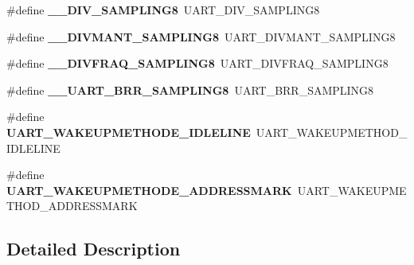 \begin{DoxyCompactItemize}
\item 
\#define {\bfseries \+\_\+\+\_\+\+D\+I\+V\+\_\+\+S\+A\+M\+P\+L\+I\+N\+G8}~U\+A\+R\+T\+\_\+\+D\+I\+V\+\_\+\+S\+A\+M\+P\+L\+I\+N\+G8\hypertarget{group___h_a_l___u_a_r_t___aliased___defines_ga5cba2faadc25e5ece57cd3322adf4151}{}\label{group___h_a_l___u_a_r_t___aliased___defines_ga5cba2faadc25e5ece57cd3322adf4151}

\item 
\#define {\bfseries \+\_\+\+\_\+\+D\+I\+V\+M\+A\+N\+T\+\_\+\+S\+A\+M\+P\+L\+I\+N\+G8}~U\+A\+R\+T\+\_\+\+D\+I\+V\+M\+A\+N\+T\+\_\+\+S\+A\+M\+P\+L\+I\+N\+G8\hypertarget{group___h_a_l___u_a_r_t___aliased___defines_ga79e617709be4f56d9a327ca3a7dc316f}{}\label{group___h_a_l___u_a_r_t___aliased___defines_ga79e617709be4f56d9a327ca3a7dc316f}

\item 
\#define {\bfseries \+\_\+\+\_\+\+D\+I\+V\+F\+R\+A\+Q\+\_\+\+S\+A\+M\+P\+L\+I\+N\+G8}~U\+A\+R\+T\+\_\+\+D\+I\+V\+F\+R\+A\+Q\+\_\+\+S\+A\+M\+P\+L\+I\+N\+G8\hypertarget{group___h_a_l___u_a_r_t___aliased___defines_gac09eaea0db063364f5aac90f47791989}{}\label{group___h_a_l___u_a_r_t___aliased___defines_gac09eaea0db063364f5aac90f47791989}

\item 
\#define {\bfseries \+\_\+\+\_\+\+U\+A\+R\+T\+\_\+\+B\+R\+R\+\_\+\+S\+A\+M\+P\+L\+I\+N\+G8}~U\+A\+R\+T\+\_\+\+B\+R\+R\+\_\+\+S\+A\+M\+P\+L\+I\+N\+G8\hypertarget{group___h_a_l___u_a_r_t___aliased___defines_ga446f5df9b1c7c4f2bded186402dd4e62}{}\label{group___h_a_l___u_a_r_t___aliased___defines_ga446f5df9b1c7c4f2bded186402dd4e62}

\item 
\#define {\bfseries U\+A\+R\+T\+\_\+\+W\+A\+K\+E\+U\+P\+M\+E\+T\+H\+O\+D\+E\+\_\+\+I\+D\+L\+E\+L\+I\+NE}~U\+A\+R\+T\+\_\+\+W\+A\+K\+E\+U\+P\+M\+E\+T\+H\+O\+D\+\_\+\+I\+D\+L\+E\+L\+I\+NE\hypertarget{group___h_a_l___u_a_r_t___aliased___defines_gab6e73a11dc29f715c2f3e48df9d9f30f}{}\label{group___h_a_l___u_a_r_t___aliased___defines_gab6e73a11dc29f715c2f3e48df9d9f30f}

\item 
\#define {\bfseries U\+A\+R\+T\+\_\+\+W\+A\+K\+E\+U\+P\+M\+E\+T\+H\+O\+D\+E\+\_\+\+A\+D\+D\+R\+E\+S\+S\+M\+A\+RK}~U\+A\+R\+T\+\_\+\+W\+A\+K\+E\+U\+P\+M\+E\+T\+H\+O\+D\+\_\+\+A\+D\+D\+R\+E\+S\+S\+M\+A\+RK\hypertarget{group___h_a_l___u_a_r_t___aliased___defines_ga0535d8a60a1563f7216a0f4b62a39c43}{}\label{group___h_a_l___u_a_r_t___aliased___defines_ga0535d8a60a1563f7216a0f4b62a39c43}

\end{DoxyCompactItemize}


\subsection{Detailed Description}
